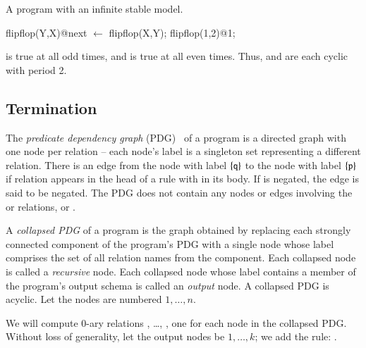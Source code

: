 \begin{example}
\label{ex:flipflop}
A \lang program with an infinite stable model.

\begin{Dedalus}
flipflop(Y,X)@next \(\leftarrow\) flipflop(X,Y);
flipflop(1,2)@1;
\end{Dedalus}

 is true at all odd times, and  is true at all even times.  Thus,  and  are each cyclic with period 2.
\end{example}


\subsection{Termination}


The {\em predicate dependency graph} (PDG)~\cite{ullmanbook} of a \lang program is a directed graph with one node per relation -- each node's label is a singleton set representing a different relation.  There is an edge from the node with label $\{\dedalus{q}\}$ to the node with label $\{\dedalus{p}\}$ if relation  appears in the head of a rule with  in its body.  If  is negated, the edge is said to be negated.  The PDG does not contain any nodes or edges involving the  or  relations, or .

A {\em collapsed PDG} of a \lang program is the graph obtained by replacing each strongly connected component of the program's PDG with a single node whose label comprises the set of all relation names from the component.  Each collapsed node is called a {\em recursive} node.  Each collapsed node whose label contains a member of the program's output schema is called an {\em output} node.   A collapsed PDG is acyclic.  Let the nodes are numbered $1,\ldots,n$.

We will compute 0-ary relations , \ldots, , one for each node in the collapsed PDG.  Without loss of generality, let the output nodes be $1,\ldots,k$; we add the rule: .


